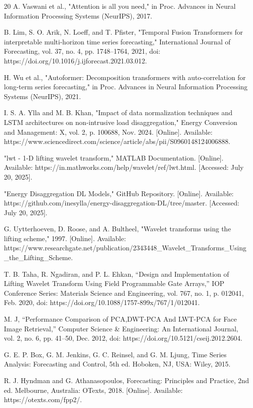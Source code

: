 \documentclass[journal]{IEEEtran}
\begin{document}
\begin{thebibliography}{20}
A. Vaswani et al., "Attention is all you need," in Proc. Advances in Neural Information Processing Systems (NeurIPS), 2017.

B. Lim, S. O. Arik, N. Loeff, and T. Pfister, "Temporal Fusion Transformers for interpretable multi-horizon time series forecasting," International Journal of Forecasting, vol. 37, no. 4, pp. 1748--1764, 2021, doi: https://doi.org/10.1016/j.ijforecast.2021.03.012.

H. Wu et al., "Autoformer: Decomposition transformers with auto-correlation for long-term series forecasting," in Proc. Advances in Neural Information Processing Systems (NeurIPS), 2021.

I. S. A. Ylla and M. B. Khan, "Impact of data normalization techniques and LSTM architectures on non-intrusive load disaggregation," Energy Conversion and Management: X, vol. 2, p. 100688, Nov. 2024. [Online]. Available: https://www.sciencedirect.com/science/article/abs/pii/S0960148124006888.

"lwt - 1-D lifting wavelet transform," MATLAB Documentation. [Online]. Available: https://in.mathworks.com/help/wavelet/ref/lwt.html. [Accessed: July 20, 2025].

"Energy Disaggregation DL Models," GitHub Repository. [Online]. Available: https://github.com/inesylla/energy-disaggregation-DL/tree/master. [Accessed: July 20, 2025].

G. Uytterhoeven, D. Roose, and A. Bultheel, "Wavelet transforms using the lifting scheme," 1997. [Online]. Available: https://www.researchgate.net/publication/2343448\_Wavelet\_Transforms\_Using\_the\_Lifting\_Scheme.

T. B. Taha, R. Ngadiran, and P. L. Ehkan, “Design and Implementation of Lifting Wavelet Transform Using Field Programmable Gate Arrays,” IOP Conference Series: Materials Science and Engineering, vol. 767, no. 1, p. 012041, Feb. 2020, doi: https://doi.org/10.1088/1757-899x/767/1/012041.

M. J, “Performance Comparison of PCA,DWT-PCA And LWT-PCA for Face Image Retrieval,” Computer Science \& Engineering: An International Journal, vol. 2, no. 6, pp. 41–50, Dec. 2012, doi: https://doi.org/10.5121/cseij.2012.2604.

G. E. P. Box, G. M. Jenkins, G. C. Reinsel, and G. M. Ljung, Time Series Analysis: Forecasting and Control, 5th ed. Hoboken, NJ, USA: Wiley, 2015.

R. J. Hyndman and G. Athanasopoulos, Forecasting: Principles and Practice, 2nd ed. Melbourne, Australia: OTexts, 2018. [Online]. Available: https://otexts.com/fpp2/.

\end{thebibliography}
\end{document}
